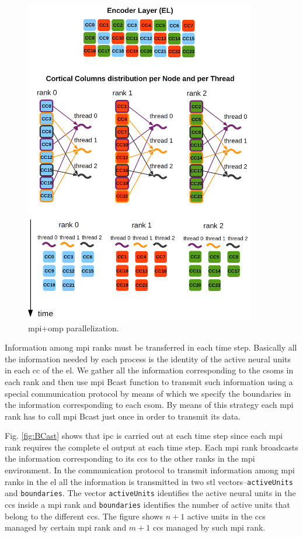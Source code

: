 {\begin{figure}[h!]
    \centering
    \includegraphics[width=0.9\textwidth]{Encoder_Parallelization.png}
    \caption{ \gls{mpi}+\gls{omp} parallelization.}
    \label{fig:Encoder_Parallelization}
\end{figure}

Information among \gls{mpi} ranks must be transferred in each time step. Basically all the information needed by each process is the identity of the active neural units in each \gls{cc} of the \gls{el}. We gather all the information corresponding to the \glspl{csom} in each rank and then use \gls{mpi} Bcast function to transmit such information using a special communication protocol by means of which we specify the boundaries in the information corresponding to each \gls{csom}. By means of this strategy each \gls{mpi} rank has to call \gls{mpi} Bcast just once in order to transmit its data.

Fig. \ref{fig:BCast} shows that \gls{ipc} is carried out at each time step since each \gls{mpi} rank requires the complete \gls{el} output at each time step. Each \gls{mpi} rank broadcasts the information corresponding to its \glspl{cc} to the other ranks in the \gls{mpi} environment. In the communication protocol to transmit information among \gls{mpi} ranks in the \gls{el} all the information is transmitted in two \gls{stl} vectors--\texttt{activeUnits} and \texttt{boundaries}. The vector \texttt{activeUnits} identifies the active neural units in the \glspl{cc} inside a \gls{mpi} rank and \texttt{boundaries} identifies the number of active units that belong to the different \glspl{cc}. The figure shows $n+1$ active units in the \glspl{cc} managed by certain \gls{mpi} rank and $m+1$ \glspl{cc} managed by such \gls{mpi} rank.

}
